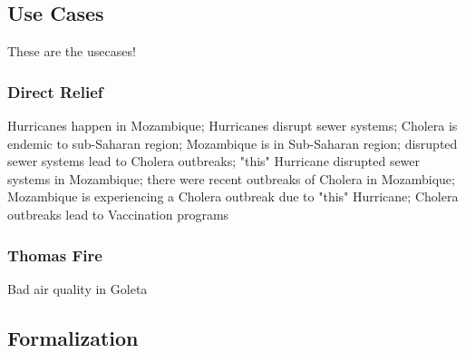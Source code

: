 \subsection{Use Cases}
\label{ssec:use-cases}
These are the usecases!

\subsubsection{Direct Relief}
Hurricanes happen in Mozambique; Hurricanes disrupt sewer systems; Cholera is endemic to sub-Saharan region; Mozambique is in Sub-Saharan region; disrupted sewer systems lead to Cholera outbreaks; "this" Hurricane disrupted sewer systems in Mozambique; there were recent outbreaks of Cholera in Mozambique; Mozambique is experiencing a Cholera outbreak due to "this" Hurricane; Cholera outbreaks lead to Vaccination programs

\subsubsection{Thomas Fire}
Bad air quality in Goleta



\subsection{Formalization}
\label{ssec:formalization}
